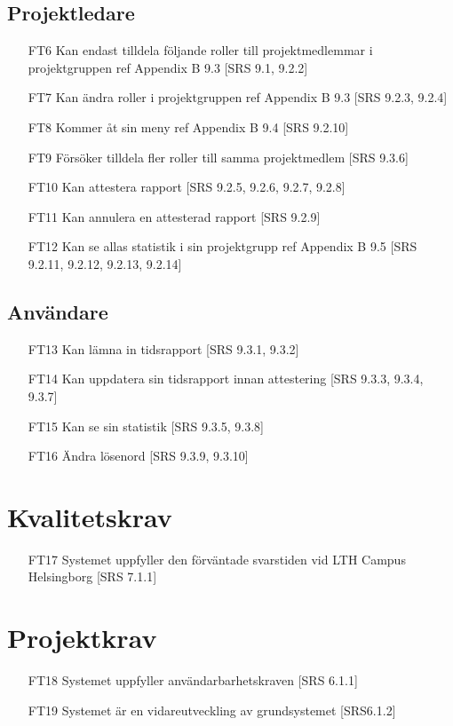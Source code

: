 \documentclass[paper=a4, fontsize=11pt,twoside]{article}
\begin{document}
\subsection{Projektledare}  
\begin{itemize}
\item[FT6] Kan endast tilldela följande roller till projektmedlemmar i projektgruppen ref Appendix B 9.3 [SRS 9.1, 9.2.2]
\item[FT7] Kan ändra roller i projektgruppen ref Appendix B 9.3 [SRS 9.2.3, 9.2.4]
\item[FT8] Kommer åt sin meny ref Appendix B 9.4 [SRS 9.2.10] 
\item[FT9] Försöker tilldela fler roller till samma projektmedlem [SRS 9.3.6] 
\item[FT10] Kan attestera rapport [SRS 9.2.5, 9.2.6, 9.2.7, 9.2.8] 
\item[FT11] Kan annulera en attesterad rapport [SRS 9.2.9] 
\item[FT12] Kan se allas statistik i sin projektgrupp ref Appendix B 9.5 [SRS 9.2.11, 9.2.12, 9.2.13, 9.2.14]
\end{itemize}


\subsection{Användare} 
\begin{itemize}
\item[FT13] Kan lämna in tidsrapport [SRS 9.3.1, 9.3.2] 
\item[FT14] Kan uppdatera sin tidsrapport innan attestering [SRS 9.3.3,
9.3.4, 9.3.7]
\item[FT15] Kan se sin statistik [SRS 9.3.5, 9.3.8] 
\item[FT16] Ändra lösenord [SRS 9.3.9, 9.3.10] 
\end{itemize}

\section{Kvalitetskrav} 
\begin{itemize}
\item[FT17] Systemet uppfyller den förväntade svarstiden vid LTH Campus Helsingborg
[SRS 7.1.1]
\end{itemize}

\section{Projektkrav} 
\begin{itemize}
\item[FT18] Systemet uppfyller användarbarhetskraven [SRS 6.1.1] 
\item[FT19] Systemet är en vidareutveckling av grundsystemet [SRS6.1.2]
\end{itemize}
\end{document}
